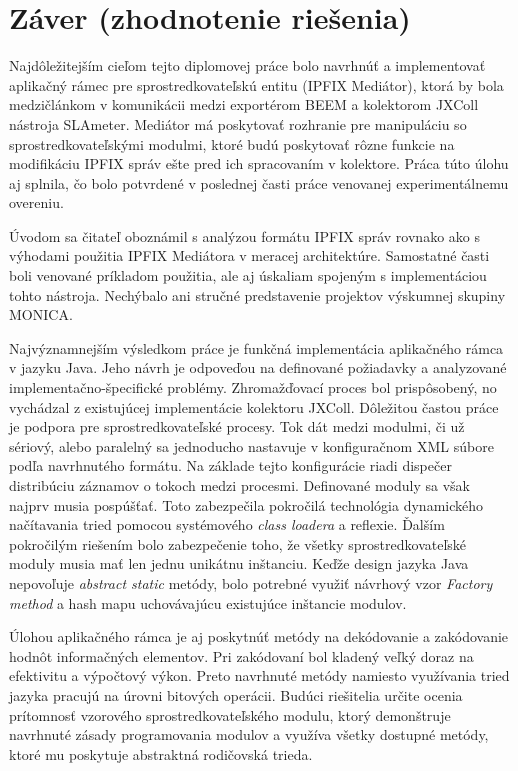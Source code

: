 \section{Z\'aver (zhodnotenie rie\v{s}enia)}

Najdôležitejším cieľom tejto diplomovej práce bolo navrhnúť a implementovať aplikačný rámec pre 
sprostredkovateľskú entitu (IPFIX Mediátor), ktorá by bola medzičlánkom v komunikácii medzi exportérom
BEEM a kolektorom JXColl nástroja SLAmeter. Mediátor má poskytovať rozhranie pre manipuláciu so 
sprostredkovateľskými modulmi, ktoré budú poskytovať rôzne funkcie na modifikáciu IPFIX správ ešte pred ich 
spracovaním v kolektore. Práca túto úlohu aj splnila, čo bolo potvrdené v poslednej časti 
práce venovanej experimentálnemu overeniu.

Úvodom sa čitateľ oboznámil s analýzou formátu IPFIX správ rovnako ako s výhodami použitia 
IPFIX Mediátora v meracej architektúre. Samostatné časti boli venované príkladom použitia, ale aj 
úskaliam spojeným s implementáciou tohto nástroja. Nechýbalo ani stručné predstavenie projektov výskumnej 
skupiny MONICA.

Najvýznamnejším výsledkom práce je funkčná implementácia aplikačného rámca v jazyku Java. Jeho návrh je 
odpoveďou na definované požiadavky a analyzované implementačno-špecifické problémy. Zhromažďovací proces 
bol prispôsobený, no vychádzal z existujúcej implementácie kolektoru JXColl. Dôležitou častou práce je 
podpora pre sprostredkovateľské procesy. Tok dát medzi modulmi, či už sériový, alebo paralelný sa  
jednoducho nastavuje v konfiguračnom XML súbore podľa navrhnutého formátu. Na základe tejto konfigurácie 
riadi dispečer distribúciu záznamov o tokoch medzi procesmi. Definované moduly sa však najprv musia 
pospúšťať. Toto zabezpečila pokročilá technológia dynamického načítavania tried pomocou 
systémového \emph{class loadera} a reflexie. Ďalším pokročilým riešením bolo zabezpečenie toho, že 
všetky sprostredkovateľské moduly musia mať len jednu unikátnu inštanciu. Keďže design jazyka Java 
nepovoľuje \emph{abstract static} metódy, bolo potrebné využiť návrhový vzor \emph{Factory method} a 
hash mapu uchovávajúcu existujúce inštancie modulov. 

Úlohou aplikačného rámca je aj poskytnúť metódy na dekódovanie a zakódovanie hodnôt informačných elementov.
Pri zakódovaní bol kladený veľký doraz na efektivitu a výpočtový výkon. Preto navrhnuté metódy namiesto 
využívania tried jazyka pracujú na úrovni bitových operácii. Budúci riešitelia určite ocenia prítomnosť
vzorového sprostredkovateľského modulu, ktorý demonštruje navrhnuté zásady programovania modulov a 
využíva všetky dostupné metódy, ktoré mu poskytuje abstraktná rodičovská trieda. 

